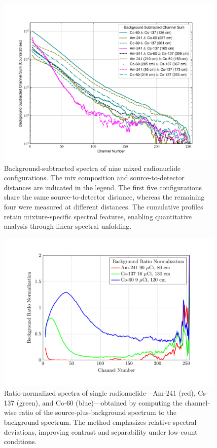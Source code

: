 \documentclass[10pt]{wlscirep}
\begin{document}
\begin{figure}[ht]
\centering
\includegraphics[width=\linewidth]{newfigures/figure3.pdf}
\caption{Background-subtracted spectra of nine mixed radionuclide configurations. The mix composition and source-to-detector distances are indicated in the legend. The first five configurations share the same source-to-detector distance, whereas the remaining four were measured at different distances. The cumulative profiles retain mixture-specific spectral features, enabling quantitative analysis through linear spectral unfolding.}
\label{fig:csbrs}
\end{figure}

\newpage

\begin{figure}[ht]
\centering
\includegraphics[width=\linewidth]{figure/fig05_CSRN.pdf}
\caption{ Ratio-normalized spectra of single radionuclide—Am-241 (red), Cs-137 (green), and Co-60 (blue)—obtained by computing the channel-wise ratio of the source-plus-background spectrum to the background spectrum. The method emphasizes relative spectral deviations, improving contrast and separability under low-count conditions.}
\label{fig:csbs}
\end{figure}
\end{document}
